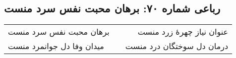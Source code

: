 \begin{center}
\section*{رباعی شماره ۷۰: برهان محبت نفس سرد منست}
\label{sec:sh070}
\begin{longtable}{l p{0.5cm} r}
برهان محبت نفس سرد منست
&&
عنوان نیاز چهرهٔ زرد منست
\\
میدان وفا دل جوانمرد منست
&&
درمان دل سوختگان درد منست
\\
\end{longtable}
\end{center}
